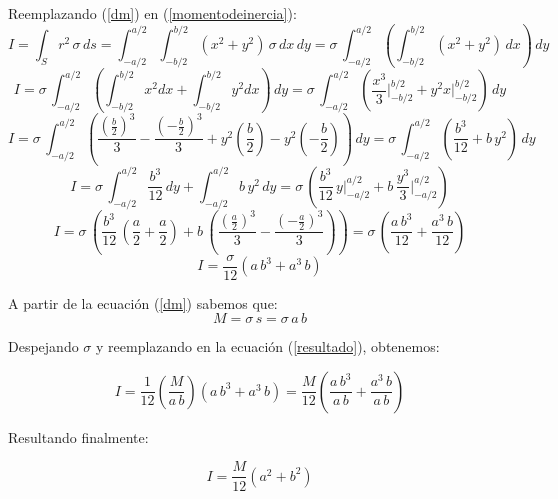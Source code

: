 \documentclass[letter,11pt]{article}
\begin{document}
Reemplazando (\ref{dm}) en (\ref{momentodeinercia}):
\begin{equation*}
    I = \int_{S} r^2\, \sigma\, ds = \int_{-a/2}^{a/2} \int_{-b/2}^{b/2} (x^2 + y^2)\, \sigma\, dx\, dy = \sigma\, \int_{-a/2}^{a/2} \left( \int_{-b/2}^{b/2} (x^2 + y^2)\, dx \right) \, dy
\end{equation*}
\begin{equation*}
    I = \sigma\, \int_{-a/2}^{a/2} \left( \int_{-b/2}^{b/2} x^2 dx + \int_{-b/2}^{b/2} y^2 dx \right) \, dy = \sigma\, \int_{-a/2}^{a/2} \left( \frac{x^3}{3} \Biggr|_{-b/2}^{b/2} + y^2 x \Biggr|_{-b/2}^{b/2} \right) \, dy
\end{equation*}
\begin{equation*}
    I = \sigma\, \int_{-a/2}^{a/2} \left( \frac{(\frac{b}{2})^3}{3} - \frac{(-\frac{b}{2})^3}{3} + y^2 \left( \frac{b}{2}\right) - y^2 \left( -\frac{b}{2}\right) \right) \, dy = \sigma\, \int_{-a/2}^{a/2} \left( \frac{b^3}{12} + b\, y^2  \right) \, dy
\end{equation*}
\begin{equation*}
    I = \sigma\, \int_{-a/2}^{a/2} \frac{b^3}{12}\, dy + \int_{-a/2}^{a/2} b\, y^2\, dy = \sigma\, \left( \frac{b^3}{12}\, y \Biggr|_{-a/2}^{a/2} + b\, \frac{y^3}{3} \Biggr|_{-a/2}^{a/2} \right)
\end{equation*}
\begin{equation*}
    I = \sigma\, \left( \frac{b^3}{12}\, \left( \frac{a}{2} + \frac{a}{2} \right) + b\, \left( \frac{(\frac{a}{2})^3}{3} - \frac{(-\frac{a}{2})^3}{3} \right) \right) = \sigma\, \left( \frac{a\, b^3}{12} + \frac{a^3\, b}{12} \right)
\end{equation*}
\begin{equation}
    I = \frac{\sigma}{12} (a\, b^3 + a^3\, b)
\label{resultado}
\end{equation}

A partir de la ecuación (\ref{dm}) sabemos que:
\begin{equation*}
    M = \sigma\, s = \sigma\, a\, b
\end{equation*}

Despejando $\sigma$ y reemplazando en la ecuación (\ref{resultado}), obtenemos:

\begin{equation*}
    I = \frac{1}{12} \left( \frac{M}{a\, b} \right) (a\, b^3 + a^3\, b) = \frac{M}{12} \left( \frac{a\, b^3}{a\, b} + \frac{a^3\, b}{a\, b} \right)
\end{equation*}

Resultando finalmente:

\begin{equation}
    I = \frac{M}{12} (a^2 + b^2)
\label{final}
\end{equation}
\end{document}
